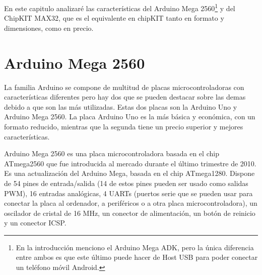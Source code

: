 

En este capitulo analizaré las características del Arduino Mega 2560\footnote{En la introducción menciono el Arduino Mega ADK, pero la única diferencia entre ambos es que este último puede hacer de Host USB para poder conectar un teléfono móvil Android.} y del ChipKIT MAX32, que es el equivalente en chipKIT tanto en formato y dimensiones, como en precio.

\section{Arduino Mega 2560}
La familia Arduino se compone de multitud de placas microcontroladoras con características diferentes pero hay dos que se pueden destacar sobre las demas debido a que son las más utilizadas.  Estas dos placas son la Arduino Uno y Arduino Mega 2560. La placa Arduino Uno es la más básica y económica, con un formato reducido, mientras que la segunda tiene un precio superior y mejores características.


Arduino Mega 2560 es una placa microcontroladora basada en el chip ATmega2560 que fue introducida al mercado durante el último trimestre de 2010.  Es una actualización del Arduino Mega, basada en el chip ATmega1280.  Dispone de 54 pines de entrada/salida (14 de estos pines pueden ser usado como salidas PWM), 16 entradas analógicas, 4 UARTs (puertos serie que se pueden usar para conectar la placa al ordenador, a periféricos o a otra placa microcontroladora), un oscilador de cristal de 16 MHz, un conector de alimentación, un botón de reinicio y un conector ICSP.

